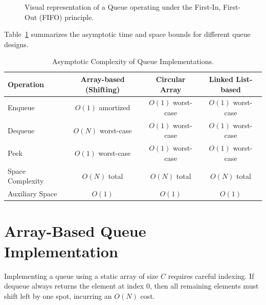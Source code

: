 \documentclass[10pt,journal,compsoc,onecolumn]{IEEEtran}
\begin{document}
\begin{figure}[htbp]
\centering
{}
\caption{Visual representation of a Queue operating under the First-In, First-Out (FIFO) principle.}
\label{fig:queue_adt}
\end{figure}

Table~\ref{tab:queue_complexities} summarizes the asymptotic time and space bounds for different queue designs.

\begin{table}[htbp]
\centering
\caption{Asymptotic Complexity of Queue Implementations.}
\label{tab:queue_complexities}
\begin{tabular}{lccc}
\toprule
Operation & Array-based (Shifting) & Circular Array & Linked List-based \\
\midrule
Enqueue & $O(1)$ amortized & $O(1)$ worst-case & $O(1)$ worst-case \\
Dequeue & $O(N)$ worst-case & $O(1)$ worst-case & $O(1)$ worst-case \\
Peek & $O(1)$ worst-case & $O(1)$ worst-case & $O(1)$ worst-case \\
Space Complexity & $O(N)$ total & $O(N)$ total & $O(N)$ total \\
Auxiliary Space & $O(1)$ & $O(1)$ & $O(1)$ \\
\bottomrule
\end{tabular}
\end{table}

\section{Array-Based Queue Implementation}
\label{sec:array_queue}
Implementing a queue using a static array of size $C$ requires careful indexing. If dequeue always returns the element at index $0$, then all remaining elements must shift left by one spot, incurring an $O(N)$ cost.
\end{document}
